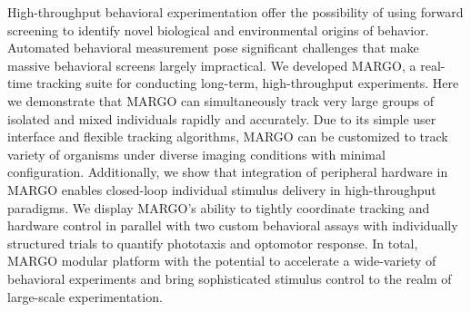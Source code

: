 \documentclass[10pt]{article}
\begin{document}
High-throughput behavioral experimentation offer the possibility of using forward screening to identify novel biological and environmental origins of behavior. Automated behavioral measurement pose significant challenges that make massive behavioral screens largely impractical. 
We developed MARGO, a real-time tracking suite for conducting long-term, high-throughput experiments. Here we demonstrate that MARGO can simultaneously track very large groups of isolated and mixed individuals rapidly and accurately. Due to its simple user interface and flexible tracking algorithms, MARGO can be customized to track variety of organisms under diverse imaging conditions with minimal configuration. Additionally, we show that integration of peripheral hardware in MARGO enables closed-loop individual stimulus delivery in high-throughput paradigms. We display MARGO's ability to tightly coordinate tracking and hardware control in parallel with two custom behavioral assays with individually structured trials to quantify phototaxis and optomotor response. In total, MARGO modular platform with the potential to accelerate a wide-variety of behavioral experiments and bring sophisticated stimulus control to the realm of large-scale experimentation.
\end{document}
